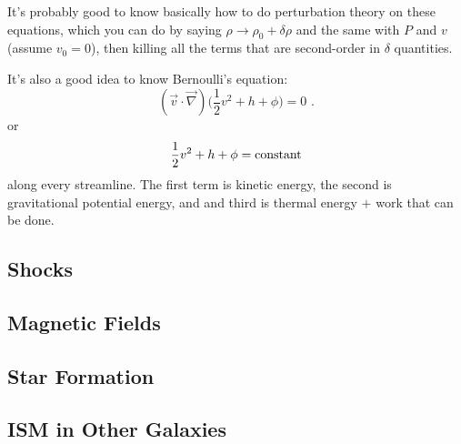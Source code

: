 It's probably good to know basically how to do perturbation theory on these equations, which you can do by saying $\rho \rightarrow \rho_0 + \delta \rho$ and the same with $P$ and $v$ (assume $v_0 = 0$), then killing all the terms that are second-order in $\delta$ quantities.

It's also a good idea to know Bernoulli's equation:
\begin{equation}
(\vec{v}\cdot \vec{\nabla})\biggl(\frac{1}{2} v^2 + h + \phi \biggr) = 0\,\, .
\end{equation}
or
\begin{equation}
\frac{1}{2} v^2 + h + \phi = {\rm constant}
\end{equation}
along every streamline. The first term is kinetic energy, the second is gravitational potential energy, and and third is thermal energy $+$ work that can be done.

\subsection{Shocks}

\subsection{Magnetic Fields}

\subsection{Star Formation}

\subsection{ISM in Other Galaxies}
